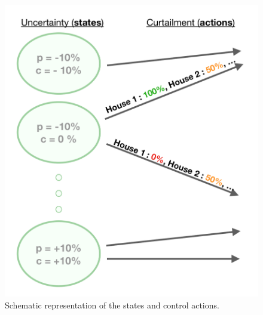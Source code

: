 \begin{figure}
  \begin{center}
    \includegraphics[scale=0.43]{./img/model_diagram.png}
  \end{center}
  \caption{Schematic representation of the states and control actions.}
  \label{fig:model_diag}
\end{figure}